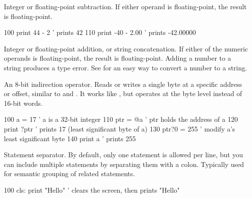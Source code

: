\begin{entry}
Integer or floating-point subtraction. If either operand is floating-point, the result is floating-point.

\begin{lstexample}
100 print 44 - 2      ' prints 42
110 print -40 - 2.00  ' prints -42.00000
\end{lstexample}
\end{entry}

\begin{entry}
Integer or floating-point addition, or string concatenation. If either of the numeric operands is floating-point, the result is floating-point. Adding a number to a string produces a type error. See  for an easy way to convert a number to a string.

\end{entry}

\begin{entry}
An 8-bit indirection operator. Reads or writes a single byte at a specific address or offset, similar to  and . It works like \code{!}, but operates at the byte level instead of 16-bit words.

\begin{lstexample}
100 a = 17        ' a is a 32-bit integer
110 ptr = @a      ' ptr holds the address of a
120 print ?ptr    ' prints 17 (least significant byte of a)
130 ptr?0 = 255   ' modify a's least significant byte
140 print a       ' prints 255
\end{lstexample}
\end{entry}

\begin{entry}
Statement separator. By default, only one statement is allowed per line, but you can include multiple statements by separating them with a colon. Typically used for semantic grouping of related statements.

\begin{lstexample}
100 cls: print "Hello"  ' clears the screen, then prints "Hello"
\end{lstexample}
\end{entry}

